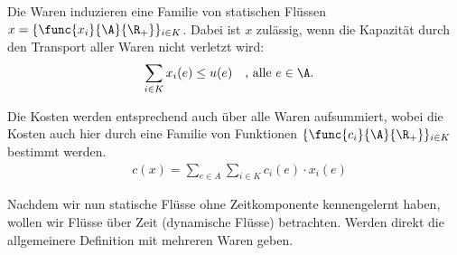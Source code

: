 \begin{definition}
    Die Waren induzieren eine Familie von statischen Flüssen
    $x = \{\func{x_i}{\A}{\R_+}\}_{i \in K}$. Dabei ist $x$ zulässig, wenn die
    Kapazität durch den Transport aller Waren nicht verletzt wird:
    \begin{align*}
        & \sum_{i \in K} x_i(e) \leq u(e) \quad \text{, alle } e \in \A.
    \end{align*}

    Die Kosten werden entsprechend auch über alle Waren aufsummiert,
    wobei die Kosten auch hier durch eine Familie von Funktionen
    $\{\func{c_i}{\A}{\R_+}\}_{i \in K}$ bestimmt werden.
    \begin{align*}
        & c(x) = \sum_{e \in A} \sum_{i \in K} c_i(e) \cdot x_i(e)
    \end{align*}
\end{definition}

Nachdem wir nun statische Flüsse ohne Zeitkomponente kennengelernt haben,
wollen wir Flüsse über Zeit (dynamische Flüsse) betrachten. Werden direkt
die allgemeinere Definition mit mehreren Waren geben.

